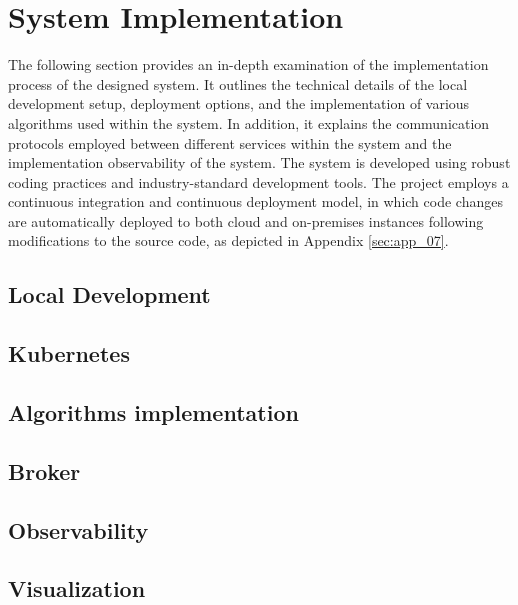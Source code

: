 \chapter{System Implementation}
The following section provides an in-depth examination of the implementation process of the designed system. It outlines the technical details of the local development setup, deployment options, and the implementation of various algorithms used within the system. In addition, it explains the communication protocols employed between different services within the system and the implementation observability of the system. The system is developed using robust coding practices and industry-standard development tools. The project employs a continuous integration and continuous deployment model, in which code changes are automatically deployed to both cloud and on-premises instances following modifications to the source code, as depicted in Appendix \ref{sec:app_07}.

\section{Local Development}


\section{Kubernetes}


\section{Algorithms implementation}


\section{Broker}


\section{Observability}
\label{sec:04_06_observability}


\section{Visualization}

